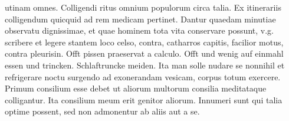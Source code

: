 %
%
utinam omnes. Colligendi ritus omnium populorum circa talia.
\pend%
\pstart%
Ex itinerariis colligendum quicquid ad rem medicam pertinet.
\pend
\pstart%
Dantur quaedam minutiae observatu dignissimae, et quae hominem tota vita conservare possunt, v.g. scribere et legere stantem loco celso, contra, catharros\protect{} capitis\protect{}, facilior motus, contra pleurisin\protect{}. Offt pissen praeservat a calculo\protect{}. Offt und wenig auf einmahl essen und trincken. Schlaftruncke meiden.
Ita 
%
man solle nudare se nonnihil et refrigerare noctu surgendo ad exonerandam vesicam, corpus\protect{} totum exercere.
\pend%
\pstart%
Primum consilium esse debet ut aliorum multorum consilia meditataque colligantur. Ita consilium meum erit genitor aliorum. Innumeri sunt qui talia optime possent, sed non admonentur ab aliis aut a se.
\pend%
\count{}
\count{}
\count{}
